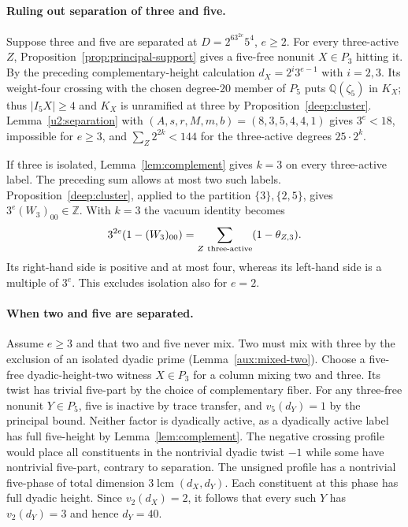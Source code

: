 \documentclass[11pt,a4paper]{article}
\numberwithin{equation}{section}
\theoremstyle{remark}
\newcommand{\ZZ}{\mathbb Z}
\newcommand{\QQ}{\mathbb Q}
\begin{document}
\paragraph{Ruling out separation of three and five.}
Suppose three and five are separated at $D=2^63^{2e}5^4$, $e\ge2$.
For every three-active $Z$, Proposition~\ref{prop:principal-support}
gives a five-free nonunit $X\in P_3$ hitting it. By the preceding
complementary-height calculation $d_X=2^i3^{e-1}$ with $i=2,3$.
Its weight-four crossing with the chosen degree-$20$ member of $P_5$
puts $\QQ(\zeta_5)$ in $K_X$; thus $|I_5X|\ge4$ and $K_X$ is
unramified at three by Proposition~\ref{deep:cluster}.
Lemma~\ref{u2:separation} with $(A,s,r,M,m,b)=(8,3,5,4,4,1)$
gives $3^e<18$, impossible for $e\ge3$, and
$\sum_Z 2^{2k}<144$ for the three-active degrees $25\cdot2^k$.

If three is isolated, Lemma~\ref{lem:complement} gives $k=3$ on every three-active
label. The preceding sum allows at most two such labels.
Proposition~\ref{deep:cluster}, applied to the partition $\{3\},\{2,5\}$, gives
$3^e(W_3)_{00}\in\ZZ$. With $k=3$ the vacuum identity becomes
\[
 3^{2e}(1-(W_3)_{00})=\sum_{Z\ {\rm three\text{-}active}}(1-\theta_{Z,3}).
\]
Its right-hand side is positive and at most four, whereas its left-hand
side is a multiple of $3^e$. This excludes isolation also for $e=2$.

\paragraph{When two and five are separated.}
Assume $e\ge3$ and that two and five never mix. Two must mix with
three by the exclusion of an isolated dyadic prime (Lemma~\ref{aux:mixed-two}). Choose a
five-free dyadic-height-two witness $X\in P_3$ for a column mixing two
and three. Its twist has trivial five-part by the choice of complementary
fiber. For any three-free nonunit $Y\in P_5$, five is inactive by trace
transfer, and $v_5(d_Y)=1$ by the principal bound. Neither factor is
dyadically active, as a dyadically active label has full five-height by
Lemma~\ref{lem:complement}. The negative crossing profile would place all constituents
in the nontrivial dyadic twist $-1$ while some have nontrivial five-part,
contrary to separation. The unsigned profile has a nontrivial five-phase
of total dimension $3\operatorname{lcm}(d_X,d_Y)$. Each constituent
at this phase has full dyadic height. Since $v_2(d_X)=2$, it follows
that every such $Y$ has $v_2(d_Y)=3$ and hence $d_Y=40$.
\end{document}
